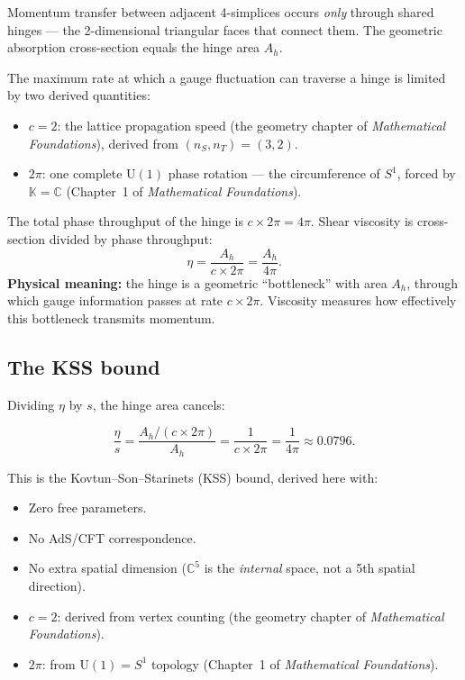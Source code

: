 \documentclass[12pt]{article}
\theoremstyle{remark}
\theoremstyle{definition}
\newcommand{\CC}{\mathbb{C}}
\begin{document}
Momentum transfer between adjacent 4-simplices occurs \emph{only} through shared hinges --- the 2-dimensional triangular faces that connect them. The geometric absorption cross-section equals the hinge area $A_h$.

The maximum rate at which a gauge fluctuation can traverse a hinge is limited by two derived quantities:
\begin{itemize}
\item $c = 2$: the lattice propagation speed (the geometry chapter of \textit{Mathematical Foundations}), derived from $(n_S, n_T) = (3, 2)$.
\item $2\pi$: one complete $\text{U}(1)$ phase rotation --- the circumference of $S^1$, forced by $\mathbb{K} = \CC$ (Chapter~1 of \textit{Mathematical Foundations}).
\end{itemize}

The total phase throughput of the hinge is $c \times 2\pi = 4\pi$. Shear viscosity is cross-section divided by phase throughput:
\begin{equation}
\eta = \frac{A_h}{c \times 2\pi} = \frac{A_h}{4\pi}.
\end{equation}
\textbf{Physical meaning:} the hinge is a geometric ``bottleneck'' with area $A_h$, through which gauge information passes at rate $c \times 2\pi$. Viscosity measures how effectively this bottleneck transmits momentum.

\subsection{The KSS bound}

Dividing $\eta$ by $s$, the hinge area cancels:

\begin{equation}
\boxed{\frac{\eta}{s} = \frac{A_h/(c \times 2\pi)}{A_h} = \frac{1}{c \times 2\pi} = \frac{1}{4\pi} \approx 0.0796.}
\end{equation}

This is the Kovtun--Son--Starinets (KSS) bound, derived here with:
\begin{itemize}
\item Zero free parameters.
\item No AdS/CFT correspondence.
\item No extra spatial dimension ($\CC^5$ is the \emph{internal} space, not a 5th spatial direction).
\item $c = 2$: derived from vertex counting (the geometry chapter of \textit{Mathematical Foundations}).
\item $2\pi$: from $\text{U}(1) = S^1$ topology (Chapter~1 of \textit{Mathematical Foundations}).
\end{itemize}
\end{document}
